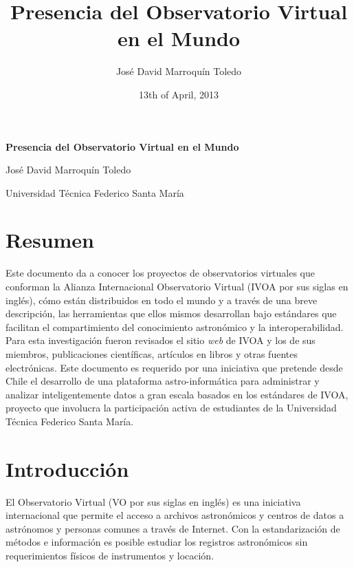 \documentclass[11pt]{article}
\title{Presencia del Observatorio Virtual en el Mundo}
\author{Jos\'{e} David Marroqu\'{i}n Toledo}
\date{13th of April, 2013}
\begin{document}
     \begin{center}
         \huge{\textbf{Presencia del Observatorio Virtual en el Mundo}}
     \end{center}
     \begin{center}
         \large{Jos\'{e} David Marroqu\'{i}n Toledo}

         \small{Universidad T\'{e}cnica Federico Santa Mar\'{i}a}
     \end{center}

     \section{Resumen}
         Este documento da a conocer los proyectos de observatorios virtuales
que conforman la Alianza Internacional Observatorio Virtual (IVOA por sus siglas
en ingl\'{e}s), c\'{o}mo est\'{a}n distribuidos en todo el mundo y a trav\'{e}s
de una breve descripci\'{o}n, las herramientas que ellos mismos desarrollan bajo
est\'{a}ndares que facilitan el compartimiento del conocimiento astron\'{o}mico
y la interoperabilidad. Para esta investigaci\'{o}n fueron revisados el sitio
\textit{web} de IVOA y los de sus miembros, publicaciones cient\'{i}ficas,
art\'{i}culos en libros y otras fuentes electr\'{o}nicas. Este documento es
requerido por una iniciativa que pretende desde Chile el desarrollo de una
plataforma astro-inform\'{a}tica para administrar y analizar inteligentemente
datos a gran escala basados en los est\'{a}ndares de IVOA, proyecto que
involucra la participaci\'{o}n activa de estudiantes de la Universidad
T\'{e}cnica Federico Santa Mar\'{i}a.

     \section{Introducci\'{o}n}
         El Observatorio Virtual (VO por sus siglas en ingl\'{e}s) es una
iniciativa internacional que permite el acceso a archivos astron\'{o}micos y
centros de datos a astr\'{o}nomos y personas comunes a trav\'{e}s de Internet.
Con la estandarizaci\'{o}n de m\'{e}todos e informaci\'{o}n es posible estudiar
los registros astron\'{o}micos sin requerimientos f\'{i}sicos de instrumentos y
locaci\'{o}n.\\
\end{document}
